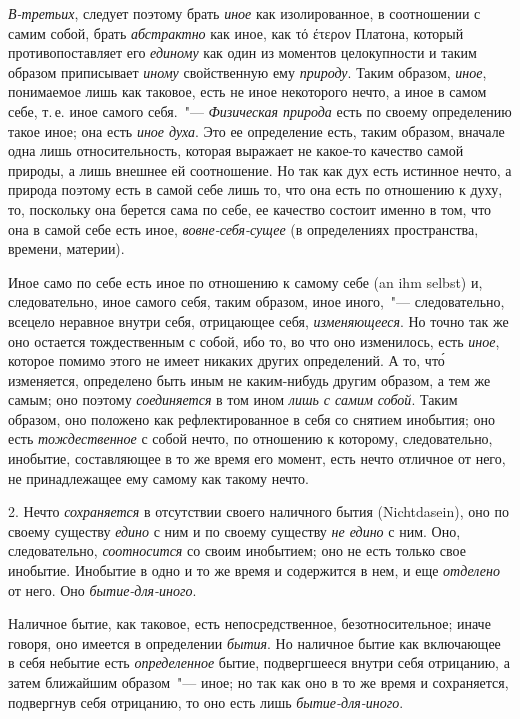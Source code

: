 \emph{В-третьих}, следует поэтому брать \emph{иное} как изолированное,
в соотношении с самим собой, брать \emph{абстрактно}
как иное, как τό έτερον Платона, который противопоставляет
его \emph{единому} как один из моментов целокупности
и таким образом приписывает \emph{иному} свойственную ему
\emph{природу}. Таким образом, \emph{иное}, понимаемое лишь как таковое,
есть не иное некоторого нечто, а иное в самом
себе, т.\,е. иное самого себя.~"--- \emph{Физическая природа} есть
по своему определению такое иное; она есть \emph{иное духа}.
Это ее определение есть, таким образом, вначале одна
лишь относительность, которая выражает не какое-то
качество самой природы, а лишь внешнее ей соотношение.
Но так как дух есть истинное нечто, а природа
поэтому есть в самой себе лишь то, что она есть по отношению
к духу, то, поскольку она берется сама по себе,
ее качество состоит именно в том, что она в самой себе
есть иное, \emph{вовне-себя-сущее} (в определениях пространства,
времени, материи).

Иное само по себе есть иное по отношению к самому
себе (an ihm selbst) и, следовательно, иное самого себя,
таким образом, иное иного,~"--- следовательно, всецело неравное
внутри себя, отрицающее себя, \emph{изменяющееся}.
Но точно так же оно остается тождественным с собой,
ибо то, во что оно изменилось, есть \emph{иное}, которое помимо
этого не имеет никаких других определений. А то, чт\'о
изменяется, определено быть иным не каким-нибудь
другим образом, а тем же самым; оно поэтому \emph{соединяется}
в том ином \emph{лишь с самим собой}. Таким образом, оно
положено как рефлектированное в себя со снятием инобытия;
оно есть \emph{тождественное} с собой нечто, по отношению
к которому, следовательно, инобытие, составляющее
в то же время его момент, есть нечто отличное от него,
не принадлежащее ему самому как такому нечто.

2. Нечто \emph{сохраняется} в отсутствии своего наличного
бытия (Nichtdasein), оно по своему существу \emph{едино} с ним
и по своему существу \emph{не едино} с ним. Оно, следовательно,
\emph{соотносится} со своим инобытием; оно не есть только
свое инобытие. Инобытие в одно и то же время и содержится
в нем, и еще \emph{отделено} от него. Оно \emph{бытие-для-иного}.

Наличное бытие, как таковое, есть непосредственное,
безотносительное; иначе говоря, оно имеется в определении
\emph{бытия}. Но наличное бытие как включающее в себя
небытие есть \emph{определенное} бытие, подвергшееся внутри
себя отрицанию, а затем ближайшим образом~"--- иное; но
так как оно в то же время и сохраняется, подвергнув себя
отрицанию, то оно есть лишь \emph{бытие-для-иного}.

